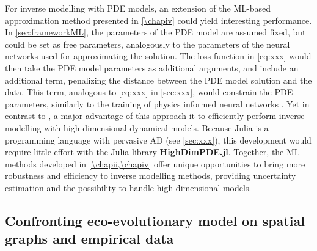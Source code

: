 For inverse modelling with PDE models, an extension of the ML-based approximation method presented in \cref{\chapiv} could yield interesting performance.
% 
In \cref{sec:frameworkML}, the parameters of the PDE model are assumed fixed, but could be set as free parameters, analogously to the parameters of the neural networks used for approximating the solution. The loss function in \cref{eq:xxx} would then take the PDE model parameters as additional arguments, and include an additional term, penalizing the distance between the PDE model solution and the data. This term, analogous to \cref{eq:xxx} in \cref{sec:xxx}, would constrain the PDE parameters, similarly to the training of physics informed neural networks \citep{Raissi2019,Yazdani2020}.
% 
Yet in contrast to \cite{Raissi2019,Yazdani2020}, a major advantage of this approach it to efficiently perform inverse modelling with high-dimensional dynamical models. Because Julia is a programming language with pervasive AD (see \cref{sec:xxx}), this development would require little effort with the Julia library \textbf{HighDimPDE.jl}.
% 
Together, the ML methods developed in \cref{\chapii,\chapiv} offer unique opportunities to bring more robustness and efficiency to inverse modelling methods, providing uncertainty estimation and the possibility to handle high dimensional models.





\subsection{Confronting eco-evolutionary model on spatial graphs and empirical data}

